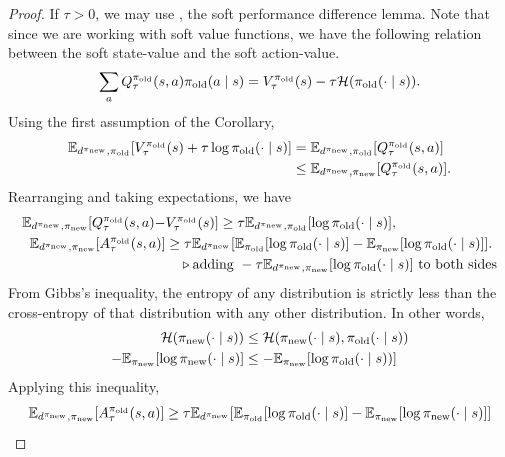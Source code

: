 \documentclass[\main/thesis.tex]{subfiles}
\begin{document}
\begin{proof}
If $\tau > 0$, we may use , the soft performance difference lemma. Note that since we are working with soft value functions, we have the following relation between the soft state-value and the soft action-value. 
\begin{align*}
    \sum_a Q_\tau^{\pi_\mathrm{old}}(s, a) {\pi_\mathrm{old}}(a \mid s) = V_\tau^{\pi_\mathrm{old}}(s) - \tau \mathcal{H}({\pi_\mathrm{old}}(\cdot \mid s)).
\end{align*}
Using the first assumption of the Corollary,
\begin{align*}
    \mathbb{E}_{d^{\pi_\mathrm{new}}, {\pi_\mathrm{old}}}[V_\tau^{\pi_\mathrm{old}}(s) + \tau \log{\pi_\mathrm{old}}(\cdot \mid s)] &= \mathbb{E}_{d^{\pi_\mathrm{new}}, {\pi_\mathrm{old}}}[ Q_\tau^{\pi_\mathrm{old}}(s, a)] \\
    &\leq \mathbb{E}_{d^{\pi_\mathrm{new}}, {\pi_\mathrm{new}}}[ Q_\tau^{\pi_\mathrm{old}}(s, a)].
\end{align*}
Rearranging and taking expectations, we have
\begin{align*}
    \mathbb{E}_{d^{\pi_\mathrm{new}}, {\pi_\mathrm{new}}}[Q_\tau^{\pi_\mathrm{old}}(s, a) -& V_\tau^{\pi_\mathrm{old}}(s)] \geq \tau \mathbb{E}_{d^{\pi_\mathrm{new}}, {\pi_\mathrm{old}}}[\log {\pi_\mathrm{old}}(\cdot \mid s)],\\
    \mathbb{E}_{d^{\pi_\mathrm{new}}, {\pi_\mathrm{new}}}[A_\tau^{\pi_\mathrm{old}}(s, a)] &\geq \tau \mathbb{E}_{d^{\pi_\mathrm{new}}}[\mathbb{E}_{{\pi_\mathrm{old}}}[\log {\pi_\mathrm{old}}(\cdot \mid s)] - \mathbb{E}_{{\pi_\mathrm{new}}}[\log {\pi_\mathrm{old}}(\cdot \mid s)]].\\
    &\quad \triangleright \text{adding } -\tau \mathbb{E}_{d^{\pi_\mathrm{new}}, {\pi_\mathrm{new}}}[\log {\pi_\mathrm{old}}(\cdot \mid s)] \text{ to both sides}
\end{align*}
From Gibbs's inequality, the entropy of any distribution is strictly less than the cross-entropy of that distribution with any other distribution. In other words,
\begin{align*}
    \mathcal{H}({\pi_\mathrm{new}}(\cdot \mid s)) &\leq \mathcal{H}({\pi_\mathrm{new}}(\cdot \mid s), {\pi_\mathrm{old}}(\cdot \mid s))\\
    -\mathbb{E}_{\pi_\mathrm{new}}[\log {\pi_\mathrm{new}}(\cdot \mid s)] &\leq - \mathbb{E}_{\pi_\mathrm{new}}[\log {\pi_\mathrm{old}}(\cdot \mid s))]
\end{align*}
Applying this inequality,
\begin{align*}
    \Ex_{d^\pinew, \pinew}[A_\tau^\piold(s, a)] &\geq \tau \Ex_{d^\pinew}[\Ex_{\piold}[\log \piold(\cdot \mid s)] - \Ex_{\pinew}[\log \pinew(\cdot \mid s)]]\\

\end{align*}
\end{proof}
\end{document}
